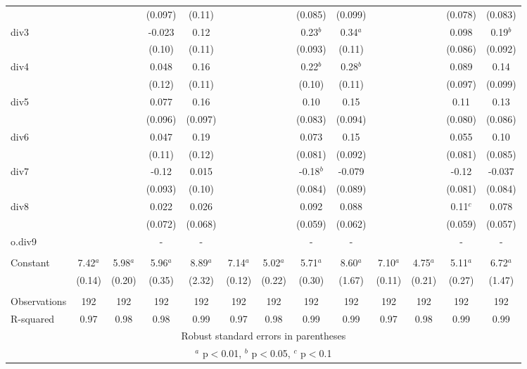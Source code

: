 \documentclass[]{article}
\begin{document}
\begin{tabular}{lcccccccccccc}
 &  &  & (0.097) & (0.11) &  &  & (0.085) & (0.099) &  &  & (0.078) & (0.083) \\
div3 &  &  & -0.023 & 0.12 &  &  & 0.23$^b$ & 0.34$^a$ &  &  & 0.098 & 0.19$^b$ \\
 &  &  & (0.10) & (0.11) &  &  & (0.093) & (0.11) &  &  & (0.086) & (0.092) \\
div4 &  &  & 0.048 & 0.16 &  &  & 0.22$^b$ & 0.28$^b$ &  &  & 0.089 & 0.14 \\
 &  &  & (0.12) & (0.11) &  &  & (0.10) & (0.11) &  &  & (0.097) & (0.099) \\
div5 &  &  & 0.077 & 0.16 &  &  & 0.10 & 0.15 &  &  & 0.11 & 0.13 \\
 &  &  & (0.096) & (0.097) &  &  & (0.083) & (0.094) &  &  & (0.080) & (0.086) \\
div6 &  &  & 0.047 & 0.19 &  &  & 0.073 & 0.15 &  &  & 0.055 & 0.10 \\
 &  &  & (0.11) & (0.12) &  &  & (0.081) & (0.092) &  &  & (0.081) & (0.085) \\
div7 &  &  & -0.12 & 0.015 &  &  & -0.18$^b$ & -0.079 &  &  & -0.12 & -0.037 \\
 &  &  & (0.093) & (0.10) &  &  & (0.084) & (0.089) &  &  & (0.081) & (0.084) \\
div8 &  &  & 0.022 & 0.026 &  &  & 0.092 & 0.088 &  &  & 0.11$^c$ & 0.078 \\
 &  &  & (0.072) & (0.068) &  &  & (0.059) & (0.062) &  &  & (0.059) & (0.057) \\
o.div9 &  &  & - & - &  &  & - & - &  &  & - & - \\
 &  &  &  &  &  &  &  &  &  &  &  &  \\
Constant & 7.42$^a$ & 5.98$^a$ & 5.96$^a$ & 8.89$^a$ & 7.14$^a$ & 5.02$^a$ & 5.71$^a$ & 8.60$^a$ & 7.10$^a$ & 4.75$^a$ & 5.11$^a$ & 6.72$^a$ \\
 & (0.14) & (0.20) & (0.35) & (2.32) & (0.12) & (0.22) & (0.30) & (1.67) & (0.11) & (0.21) & (0.27) & (1.47) \\
 &  &  &  &  &  &  &  &  &  &  &  &  \\
Observations & 192 & 192 & 192 & 192 & 192 & 192 & 192 & 192 & 192 & 192 & 192 & 192 \\
 R-squared & 0.97 & 0.98 & 0.98 & 0.99 & 0.97 & 0.98 & 0.99 & 0.99 & 0.97 & 0.98 & 0.99 & 0.99 \\ \hline
\multicolumn{13}{c}{ Robust standard errors in parentheses} \\
\multicolumn{13}{c}{ $^a$ p$<$0.01, $^b$ p$<$0.05, $^c$ p$<$0.1} \\
\end{tabular}
\end{document}

